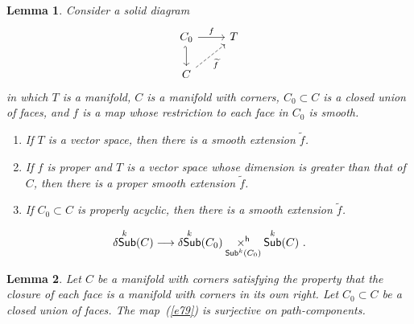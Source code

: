 \documentclass[10pt,a4paper]{amsart}
\newtheorem{lemma}{Lemma}
\DeclareMathOperator{\Sub}{\sf Sub}
\DeclareMathOperator{\dSub}{\delta{\sf Sub}}
\newcommand{\w}{\widetilde}
\begin{document}
\begin{lemma}\label{lemma.sm.sing}    
Consider a solid diagram
\[\begin{tikzcd}
	{C_0} & T \\
	C
	\arrow["f", from=1-1, to=1-2]
	\arrow[hook', from=1-1, to=2-1]
	\arrow["{\w{f}}"', dashed, from=2-1, to=1-2]
\end{tikzcd}\]
in which $T$ is a manifold, $C$ is a manifold with corners, $C_0 \subset C$ is a closed union of faces, and $f$ is a map whose restriction to each face in $C_0$ is smooth.
\begin{enumerate}
    \item 
    If $T$ is a vector space, then there is a smooth extension $\w{f}$.

    \item 
    If $f$ is proper and $T$ is a vector space whose dimension is greater than that of $C$, then there is a proper smooth extension $\w{f}$.

\item 
If $C_0 \subset C$ is properly acyclic,
then there is a smooth extension $\w{f}$.



\end{enumerate}


\end{lemma}

\begin{equation}\label{e79}
\dSub^k(C)
\longrightarrow
\dSub^k(C_0) \underset{\Sub^k(C_0)} {\times^{\sf h}} \Sub^k(C)
~.
\end{equation}

\begin{lemma}\label{t75}
Let $C$ be a manifold with corners satisfying the property that the closure of each face is a manifold with corners in its own right.  
Let $C_0 \subset C$ be a closed union of faces.
The map~(\ref{e79}) is surjective on path-components.

\end{lemma}
\end{document}

